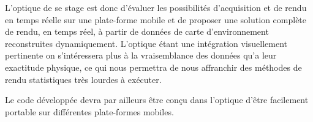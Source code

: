 \documentclass[10pt,a4paper,twoside, twocolumn]{report}
\newcommand*{\rootPath}{../}
\begin{document}
L'optique de se stage est donc d'évaluer les possibilités d'acquisition et de rendu en temps réelle sur une plate-forme mobile et de proposer une solution complète de rendu, en temps réel, à partir de données de carte d'environnement reconstruites dynamiquement. L'optique étant une intégration visuellement pertinente on s’intéressera plus à la vraisemblance des données qu'a leur exactitude physique, ce qui nous permettra de nous affranchir des méthodes de rendu statistiques très lourdes à exécuter.

Le code développée devra par ailleurs être conçu dans l'optique d'être facilement portable sur différentes plate-formes mobiles.


\ifstandalone
	
	
\fi
\end{document}
